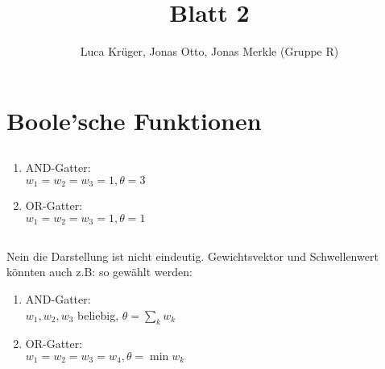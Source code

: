 \documentclass{article}
\title{Blatt 2}
\author{Luca Krüger, Jonas Otto, Jonas Merkle (Gruppe R)}
\begin{document}
\maketitle

\section{Boole'sche Funktionen}
\subsection{}
\label{gates}
\begin{enumerate}[label=\alph*)]
  \item AND-Gatter: \\
        $w_1=w_2=w_3=1, \theta=3$

  \item OR-Gatter: \\
        $w_1=w_2=w_3=1, \theta=1$
\end{enumerate}


\subsection{}
Nein die Darstellung ist nicht eindeutig. Gewichtsvektor und Schwellenwert könnten auch z.B: so gewählt werden:
\begin{enumerate}[label=\alph*)]
  \item AND-Gatter:\\
        $w_1, w_2, w_3$ beliebig, $\theta = \sum\limits_k w_k$

  \item OR-Gatter:\\
        $w_1=w_2=w_3=w_4, \theta = \min{w_k}$
\end{enumerate}
\end{document}
